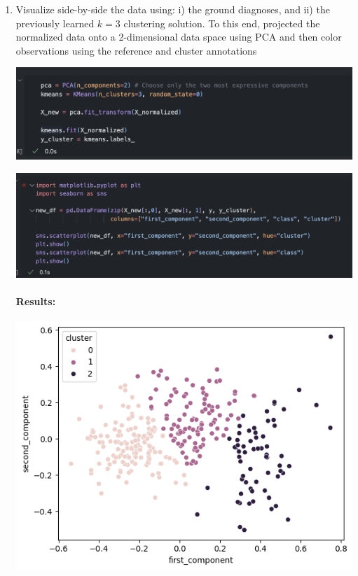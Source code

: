 \documentclass[12pt]{article}
\begin{document}
\begin{enumerate}
    \item Visualize side-by-side the data using: i) the ground diagnoses, and ii) the previously learned
    $k = 3$ clustering solution. To this end, projected the normalized data onto a 2-dimensional data
    space using PCA and then color observations using the reference and cluster annotations

    \begin{center}
        \includegraphics[scale=0.5]{images/code11.png}
    \end{center}

    \begin{center}
        \includegraphics[scale=0.5]{images/code12.png}
    \end{center}

    \paragraph{Results:}

    \begin{center}
        \includegraphics[scale=0.5]{images/graph1.png}
    \end{center}


\end{enumerate}
\end{document}
